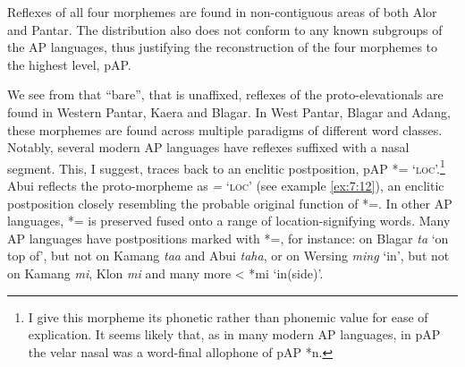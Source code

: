 Reflexes of all four morphemes are found in non-contiguous areas of both Alor and Pantar. The distribution also does not conform to any known subgroups of the AP languages, thus justifying the reconstruction of the four morphemes to the highest level, pAP.

 We see from  that ``bare'', that is unaffixed, reflexes of the proto-ele\-va\-tionals are found in Western Pantar, Kaera and Blagar. In West Pantar, Blagar and  Adang, these morphemes are found across multiple paradigms of different word classes. Notably, several modern AP languages have reflexes suffixed with a nasal segment. This, I suggest, traces back to an enclitic postposition, pAP *={\ng} `\textsc{loc}'.\footnote{I give this morpheme its phonetic rather than phonemic value for ease of explication. It seems likely that, as in many modern AP languages, in pAP the velar nasal was a word-final allophone of pAP *n.}  Abui reflects the proto-morpheme as \textit{=}\textit{{\ng}} `\textsc{loc}' (see example \ref{ex:7:12}),  an enclitic postposition closely resembling the probable original function of *={\ng}. In other AP languages, *={\ng} is preserved fused onto a range of location-signifying words. Many AP languages have postpositions marked with *={\ng}, for instance: on Blagar \textit{ta}\textit{{\ng}} `on top of', but not on Kamang \textit{taa} and Abui \textit{taha}, or on Wersing \textit{ming} `in', but not on Kamang \textit{mi}, Klon \textit{mi} and many more {\textless} *mi `in(side)'. 

